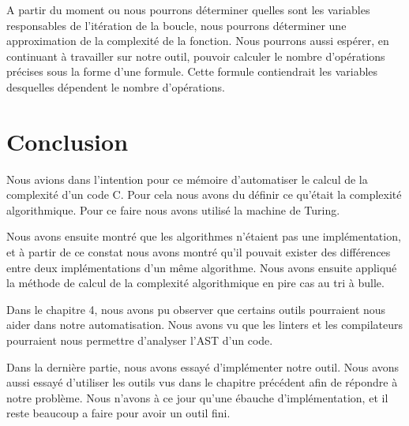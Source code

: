 \documentclass[12pt, twoside, openright]{report}
\begin{document}
A partir du moment ou nous pourrons déterminer quelles sont les variables responsables de l'itération de la boucle, nous pourrons déterminer une approximation de la complexité de la fonction. Nous pourrons aussi espérer, en continuant à travailler sur notre outil, pouvoir calculer le nombre d'opérations précises sous la forme d'une formule. Cette formule contiendrait les variables desquelles dépendent le nombre d'opérations.

\chapter{Conclusion}

Nous avions dans l'intention pour ce mémoire d'automatiser le calcul de la complexité d'un code C. Pour cela nous avons du définir ce qu'était la complexité algorithmique. Pour ce faire nous avons utilisé la machine de Turing. 

Nous avons ensuite montré que les algorithmes n'étaient pas une implémentation, et à partir de ce constat nous avons montré qu'il pouvait exister des différences entre deux implémentations d'un même algorithme. Nous avons ensuite appliqué la méthode de calcul de la complexité algorithmique en pire cas au tri à bulle.

Dans le chapitre 4, nous avons pu observer que certains outils pourraient nous aider dans notre automatisation. Nous avons vu que les linters et les compilateurs pourraient nous permettre d'analyser l'AST d'un code. 

Dans la dernière partie, nous avons essayé d'implémenter notre outil. Nous avons aussi essayé d'utiliser les outils vus dans le chapitre précédent afin de répondre à notre problème. Nous n'avons à ce jour qu'une ébauche d'implémentation, et il reste beaucoup a faire pour avoir un outil fini.

\tableofcontents
\printbibliography
\end{document}
